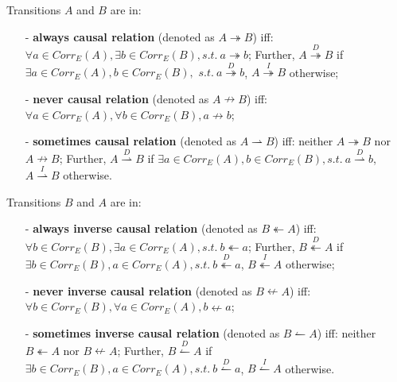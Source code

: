 \documentclass{llncs}
\begin{document}
\begin{definition}\label{def:causalRelations}
Transitions $A$ and $B$ are in: 
	\begin{itemize}
		\item[-] \textbf{always causal relation} (denoted as $A\twoheadrightarrow B$) iff: $\forall a\in Corr_{E}(A), \exists b\in Corr_{E}(B), s.t.~a\twoheadrightarrow b$; Further, $A\overset{D}{\twoheadrightarrow}B$ if $\exists a\in Corr_{E}(A), b\in Corr_{E}(B),$ $s.t.~a\overset{D}{\twoheadrightarrow}b$, $A\overset{I}{\twoheadrightarrow}B$ otherwise;
		\item[-] \textbf{never causal relation} (denoted as $A\nrightarrow B$) iff: $\forall a\in Corr_{E}(A), \forall b\in Corr_{E}(B), a\nrightarrow b$;
		\item[-] \textbf{sometimes causal relation} (denoted as $A\rightharpoonup B$) iff: neither $A\twoheadrightarrow B$ nor $A\nrightarrow B$; Further, $A\overset{D}{\rightharpoonup}B$ if $\exists a\in Corr_{E}(A), b\in Corr_{E}(B), s.t.~a\overset{D}{\rightharpoonup}b$, $A\overset{I}{\rightharpoonup}B$ otherwise.
	\end{itemize}  
\end{definition}

\begin{definition}\label{def:inverseCausalRelations}
Transitions $B$ and $A$ are in: 
	\begin{itemize}
		\item[-] \textbf{always inverse causal relation} (denoted as $B\twoheadleftarrow A$) iff: $\forall b\in Corr_{E}(B), \exists a\in Corr_{E}(A), s.t.~b\twoheadleftarrow a$; Further, $B\overset{D}{\twoheadleftarrow}A$ if $\exists b\in Corr_{E}(B), a\in Corr_{E}(A),s.t.~b\overset{D}{\twoheadleftarrow}a$, $B\overset{I}{\twoheadleftarrow}A$ otherwise;
		\item[-] \textbf{never inverse causal relation} (denoted as $B\nleftarrow A$) iff: $\forall b\in Corr_{E}(B), \forall a\in Corr_{E}(A), b\nleftarrow a$;
		\item[-] \textbf{sometimes inverse causal relation} (denoted as $B\leftharpoonup A$) iff: neither $B\twoheadleftarrow A$ nor $B\nleftarrow A$; Further, $B\overset{D}{\leftharpoonup}A$ if $\exists b\in Corr_{E}(B), a\in Corr_{E}(A), s.t.~b\overset{D}{\leftharpoonup}a$, $B\overset{I}{\leftharpoonup}A$ otherwise.
	\end{itemize}
\end{definition}
\end{document}
